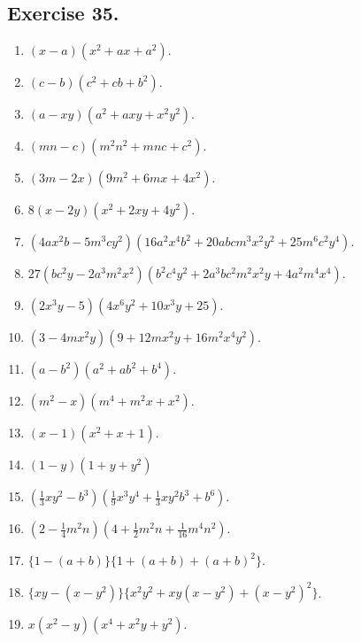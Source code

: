 \documentclass{book}
\begin{document}
\subsection*{Exercise 35.}
\begin{enumerate}


\item $(x - a)(x^2 +ax + a^2)$.

\item $(c - b)(c^2 + cb + b^2)$.

\item $(a - xy)(a^2 + axy + x^2y^2)$.

\item $(mn - c)(m^2n^2 + mnc + c^2)$.

\item $(3m - 2x)(9m^2 + 6mx + 4x^2)$.

\item $8(x - 2y)(x^2 + 2xy + 4y^2)$.

\item $(4ax^2b - 5m^3cy^2)(16a^2x^4b^2 + 20abcm^3x^2y^2 + 25m^6c^2y^4)$.

\item $27(bc^2y - 2a^3m^2x^2)(b^2c^4y^2 + 2a^3bc^2m^2x^2y + 4a^2m^4x^4)$.

\item $(2x^3y - 5)(4x^6y^2 + 10x^3y + 25)$.

\item $(3 - 4mx^2y)(9+12mx^2y + 16m^2x^4y^2)$.

\item $(a-b^2)(a^2 + ab^2 + b^4)$.

\item $(m^2 - x)(m^4 + m^2x + x^2)$.

\item $(x-1)(x^2 + x + 1)$.

\item $(1-y)(1 + y + y^2)$

\item $(\frac{1}{3}xy^2 - b^3)(\frac{1}{9}x^3y^4 + \frac{1}{3}xy^2b^3 + b^6)$.

\item $(2-\frac{1}{4}m^2n)(4+\frac{1}{2}m^2n + \frac{1}{16}m^4n^2)$.

\item $\{1 - (a + b)\} \{1+ (a+b) + (a+b)^2\}$.

\item $\{xy - (x-y^2)\} \{x^2y^2 + xy(x - y^2) + (x - y^2)^2\}$.

\item $x(x^2 - y)(x^4 + x^2y + y^2)$.


\end{enumerate}
\end{document}
